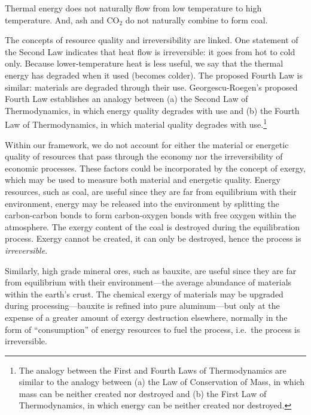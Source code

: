 \noindent{}Thermal energy does not naturally flow from low temperature to high temperature.
And, ash and CO$_{2}$ do not naturally combine to form coal.

The concepts of resource quality and irreversibility are linked.
One statement of the Second Law indicates that heat flow is irreversible: 
it goes from hot to cold only. 
Because lower-temperature heat is less useful, 
we say that the thermal energy has degraded when it used (becomes colder).
The proposed Fourth Law is similar: 
materials are degraded through their use.
Georgescu-Roegen's proposed Fourth Law establishes an analogy between
(a) the Second Law of Thermodynamics, 
in which energy quality degrades with use and
(b) the Fourth Law of Thermodynamics,
in which material quality degrades with use.\footnote{The analogy 
	between the First and Fourth Laws of Thermodynamics
	are similar to the analogy between 
		(a) the Law of Conservation of Mass, 
		in which mass can be neither created nor destroyed and 
		(b) the First Law of Thermodynamics, 
		in which energy can be neither created nor destroyed.}

Within our framework, we do not account for either
the material or energetic quality of resources 
that pass through the economy nor the 
irreversibility of economic processes.
These factors could be incorporated by
the concept of exergy, which may be used to measure
both material and energetic quality.
Energy resources, such as coal, are useful
since they are far from equilibrium with their environment,
energy may be released into the environment by
splitting the carbon-carbon bonds to form 
carbon-oxygen bonds with free oxygen 
within the atmosphere.
The exergy content of the coal is destroyed during
the equilibration process.
Exergy cannot be created, it can only be destroyed,
hence the process is \emph{irreversible}.

Similarly, high grade mineral ores, such as bauxite, 
are useful since they are far from equilibrium with their
environment---the average abundance of materials
within the earth's crust.
The chemical exergy of materials may be upgraded
during processing---bauxite is refined into pure 
aluminum---but only at the expense of a greater
amount of exergy destruction elsewhere,
normally in the form of ``consumption''
of energy resources to fuel the process,
i.e.\ the process is irreversible.



